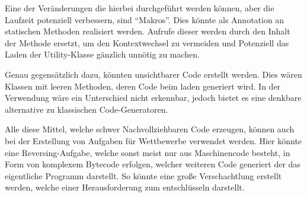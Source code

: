 Eine der Veränderungen die hierbei durchgeführt werden können, aber die Laufzeit potenziell verbessern, sind "`Makros"'. Dies könnte als Annotation an statischen Methoden realisiert werden. Aufrufe dieser werden durch den Inhalt der Methode ersetzt, um den Kontextwechsel zu vermeiden und Potenziell das Laden der Utility-Klasse gänzlich unnötig zu machen.

Genau gegensätzlich dazu, könnten unsichtbarer Code erstellt werden. Dies wären Klassen mit leeren Methoden, deren Code beim laden generiert wird. In der Verwendung wäre ein Unterschied nicht erkennbar, jedoch bietet es eine denkbare alternative zu klassischen Code-Generatoren.

Alle diese Mittel, welche schwer Nachvollziehbaren Code erzeugen, können auch bei der Erstellung von Aufgaben für Wettbewerbe verwendet werden. Hier könnte eine Reversing-Aufgabe, welche sonst meist nur aus Maschinencode besteht, in Form von komplexem Bytecode erfolgen, welcher weiteren Code generiert der das eigentliche Programm darstellt. So könnte eine große Verschachtlung erstellt werden, welche einer Herausforderung zum entschlüsseln darstellt.